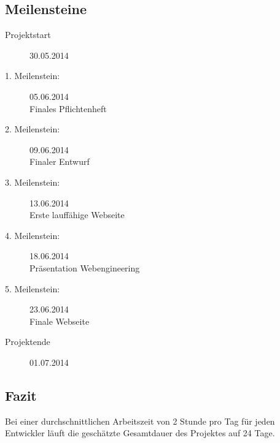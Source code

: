 \newpage
\subsection{Meilensteine}
\begin{description}
	\item[Projektstart] 30.05.2014
	\item[1. Meilenstein:] 05.06.2014\\
	Finales Pflichtenheft
	\item[2. Meilenstein:] 09.06.2014\\
	Finaler Entwurf
	\item[3. Meilenstein:] 13.06.2014\\
	Erste lauffähige Webseite
	\item[4. Meilenstein:] 18.06.2014\\
	Präsentation Webengineering
	\item[5. Meilenstein:] 23.06.2014\\
	Finale Webseite
	\item[Projektende] 01.07.2014
\end{description}

\subsection{Fazit}
Bei einer durchschnittlichen Arbeitszeit von 2 Stunde pro Tag für jeden Entwickler läuft die geschätzte Gesamtdauer des Projektes auf 24 Tage.